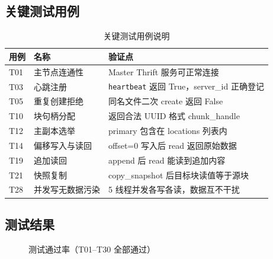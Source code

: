 \documentclass[10pt,a4paper]{article}
\begin{document}
\subsection{关键测试用例}

\begin{table}[H]
\centering
\caption{关键测试用例说明}
\begin{tabularx}{\textwidth}{llX}
\toprule
\textbf{用例} & \textbf{名称} & \textbf{验证点} \\
\midrule
T01 & 主节点连通性     & Master Thrift 服务可正常连接 \\
T03 & 心跳注册         & \texttt{heartbeat} 返回 True，server\_id 正确登记 \\
T05 & 重复创建拒绝     & 同名文件二次 create 返回 False \\
T10 & 块句柄分配       & 返回合法 UUID 格式 chunk\_handle \\
T12 & 主副本选举       & primary 包含在 locations 列表内 \\
T14 & 偏移写入与读回   & offset=0 写入后 read 返回原始数据 \\
T19 & 追加读回         & append 后 read 能读到追加内容 \\
T21 & 快照复制         & copy\_snapshot 后目标块读值等于源块 \\
T28 & 并发写无数据污染 & 5 线程并发各写各读，数据互不干扰 \\
\bottomrule
\end{tabularx}
\end{table}

\subsection{测试结果}

\begin{figure}[H]
\centering
{}
\caption{测试通过率（T01--T30 全部通过）}
\label{fig:testpie}
\end{figure}
\end{document}

